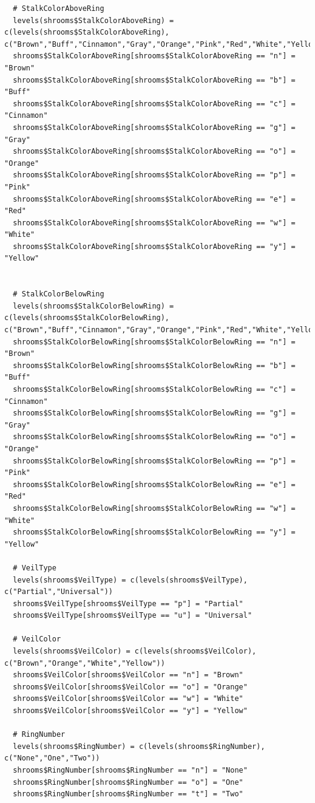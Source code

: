 \documentclass[10pt  ,usenames, dvipsnames]{article}\usepackage[]{graphicx}\usepackage[]{color}
\begin{document}
\begin{lstlisting}
  # StalkColorAboveRing
  levels(shrooms$StalkColorAboveRing) = c(levels(shrooms$StalkColorAboveRing), c("Brown","Buff","Cinnamon","Gray","Orange","Pink","Red","White","Yellow"))
  shrooms$StalkColorAboveRing[shrooms$StalkColorAboveRing == "n"] = "Brown"
  shrooms$StalkColorAboveRing[shrooms$StalkColorAboveRing == "b"] = "Buff"
  shrooms$StalkColorAboveRing[shrooms$StalkColorAboveRing == "c"] = "Cinnamon"
  shrooms$StalkColorAboveRing[shrooms$StalkColorAboveRing == "g"] = "Gray"
  shrooms$StalkColorAboveRing[shrooms$StalkColorAboveRing == "o"] = "Orange"
  shrooms$StalkColorAboveRing[shrooms$StalkColorAboveRing == "p"] = "Pink"
  shrooms$StalkColorAboveRing[shrooms$StalkColorAboveRing == "e"] = "Red"
  shrooms$StalkColorAboveRing[shrooms$StalkColorAboveRing == "w"] = "White"
  shrooms$StalkColorAboveRing[shrooms$StalkColorAboveRing == "y"] = "Yellow"
  
  
  # StalkColorBelowRing
  levels(shrooms$StalkColorBelowRing) = c(levels(shrooms$StalkColorBelowRing), c("Brown","Buff","Cinnamon","Gray","Orange","Pink","Red","White","Yellow"))
  shrooms$StalkColorBelowRing[shrooms$StalkColorBelowRing == "n"] = "Brown"
  shrooms$StalkColorBelowRing[shrooms$StalkColorBelowRing == "b"] = "Buff"
  shrooms$StalkColorBelowRing[shrooms$StalkColorBelowRing == "c"] = "Cinnamon"
  shrooms$StalkColorBelowRing[shrooms$StalkColorBelowRing == "g"] = "Gray"
  shrooms$StalkColorBelowRing[shrooms$StalkColorBelowRing == "o"] = "Orange"
  shrooms$StalkColorBelowRing[shrooms$StalkColorBelowRing == "p"] = "Pink"
  shrooms$StalkColorBelowRing[shrooms$StalkColorBelowRing == "e"] = "Red"
  shrooms$StalkColorBelowRing[shrooms$StalkColorBelowRing == "w"] = "White"
  shrooms$StalkColorBelowRing[shrooms$StalkColorBelowRing == "y"] = "Yellow"
  
  # VeilType
  levels(shrooms$VeilType) = c(levels(shrooms$VeilType), c("Partial","Universal"))
  shrooms$VeilType[shrooms$VeilType == "p"] = "Partial"
  shrooms$VeilType[shrooms$VeilType == "u"] = "Universal"
  
  # VeilColor
  levels(shrooms$VeilColor) = c(levels(shrooms$VeilColor), c("Brown","Orange","White","Yellow"))
  shrooms$VeilColor[shrooms$VeilColor == "n"] = "Brown"
  shrooms$VeilColor[shrooms$VeilColor == "o"] = "Orange"
  shrooms$VeilColor[shrooms$VeilColor == "w"] = "White"
  shrooms$VeilColor[shrooms$VeilColor == "y"] = "Yellow"
  
  # RingNumber
  levels(shrooms$RingNumber) = c(levels(shrooms$RingNumber), c("None","One","Two"))
  shrooms$RingNumber[shrooms$RingNumber == "n"] = "None"
  shrooms$RingNumber[shrooms$RingNumber == "o"] = "One"
  shrooms$RingNumber[shrooms$RingNumber == "t"] = "Two"
  

\end{lstlisting}
\end{document}
